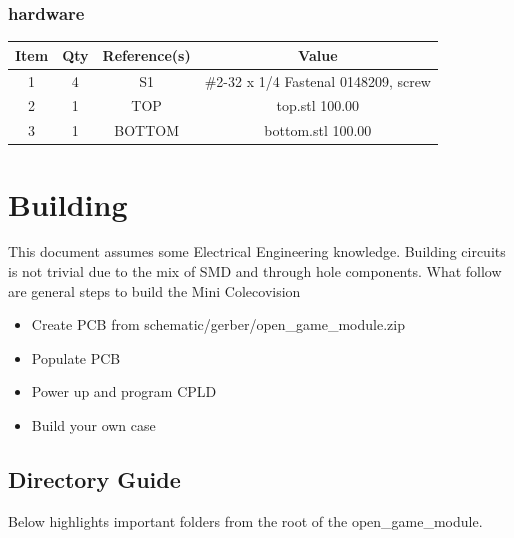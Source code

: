 \subsubsection{hardware}
\begin{footnotesize}
\begin{longtable}{ |*{4}{c|} }
\hline
{Item} & {Qty} & {Reference(s)} & {Value} \\
\hline
{1} & {4} & {S1} & {\#2-32 x 1/4 Fastenal 0148209, screw} \\
\hline
{2} & {1} & {TOP} & {top.stl 100.00} \\
\hline
{3} & {1} & {BOTTOM} & {bottom.stl 100.00} \\
\hline
\end{longtable}
\end{footnotesize}

\section{Building}

\par
This document assumes some Electrical Engineering knowledge. Building circuits is not
trivial due to the mix of SMD and through hole components. What follow are general
steps to build the Mini Colecovision

\begin{itemize}
  \item Create PCB from schematic/gerber/open\_game\_module.zip
  \item Populate PCB
  \item Power up and program CPLD
  \item Build your own case
\end{itemize}

\subsection{Directory Guide}

\par
Below highlights important folders from the root of the open\_game\_module.

